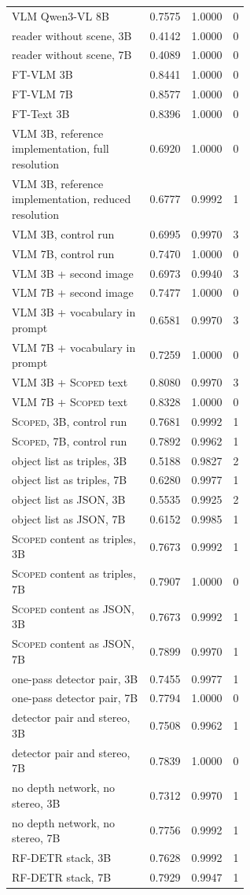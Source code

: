\documentclass[10pt]{article}
\begin{document}
\begin{longtable}{@{}p{0.60\linewidth}ccc@{}}
VLM Qwen3-VL 8B & 0.7575 & 1.0000 & 0 \\
reader without scene, 3B & 0.4142 & 1.0000 & 0 \\
reader without scene, 7B & 0.4089 & 1.0000 & 0 \\
FT-VLM 3B & 0.8441 & 1.0000 & 0 \\
FT-VLM 7B & 0.8577 & 1.0000 & 0 \\
FT-Text 3B & 0.8396 & 1.0000 & 0 \\
VLM 3B, reference implementation, full resolution & 0.6920 & 1.0000 & 0 \\
VLM 3B, reference implementation, reduced resolution & 0.6777 & 0.9992 & 1 \\
VLM 3B, control run & 0.6995 & 0.9970 & 3 \\
VLM 7B, control run & 0.7470 & 1.0000 & 0 \\
VLM 3B + second image & 0.6973 & 0.9940 & 3 \\
VLM 7B + second image & 0.7477 & 1.0000 & 0 \\
VLM 3B + vocabulary in prompt & 0.6581 & 0.9970 & 3 \\
VLM 7B + vocabulary in prompt & 0.7259 & 1.0000 & 0 \\
VLM 3B + \textsc{Scoped} text & 0.8080 & 0.9970 & 3 \\
VLM 7B + \textsc{Scoped} text & 0.8328 & 1.0000 & 0 \\
\textsc{Scoped}, 3B, control run & 0.7681 & 0.9992 & 1 \\
\textsc{Scoped}, 7B, control run & 0.7892 & 0.9962 & 1 \\
object list as triples, 3B & 0.5188 & 0.9827 & 2 \\
object list as triples, 7B & 0.6280 & 0.9977 & 1 \\
object list as JSON, 3B & 0.5535 & 0.9925 & 2 \\
object list as JSON, 7B & 0.6152 & 0.9985 & 1 \\
\textsc{Scoped} content as triples, 3B & 0.7673 & 0.9992 & 1 \\
\textsc{Scoped} content as triples, 7B & 0.7907 & 1.0000 & 0 \\
\textsc{Scoped} content as JSON, 3B & 0.7673 & 0.9992 & 1 \\
\textsc{Scoped} content as JSON, 7B & 0.7899 & 0.9970 & 1 \\
one-pass detector pair, 3B & 0.7455 & 0.9977 & 1 \\
one-pass detector pair, 7B & 0.7794 & 1.0000 & 0 \\
detector pair and stereo, 3B & 0.7508 & 0.9962 & 1 \\
detector pair and stereo, 7B & 0.7839 & 1.0000 & 0 \\
no depth network, no stereo, 3B & 0.7312 & 0.9970 & 1 \\
no depth network, no stereo, 7B & 0.7756 & 0.9992 & 1 \\
RF-DETR stack, 3B & 0.7628 & 0.9992 & 1 \\
RF-DETR stack, 7B & 0.7929 & 0.9947 & 1 \\
\end{longtable}
\end{document}
